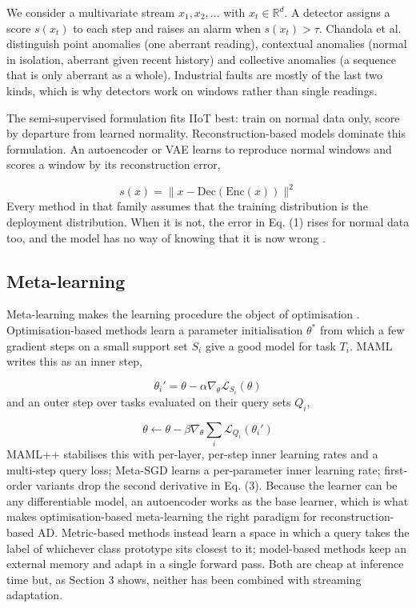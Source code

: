 We consider a multivariate stream \(x_1, x_2, \dots\) with \(x_t \in \mathbb{R}^d\). A detector assigns a score \(s(x_t)\) to each step and raises an alarm when \(s(x_t) > \tau\). Chandola et al. \citep{chandola2009survey} distinguish point anomalies (one aberrant reading), contextual anomalies (normal in isolation, aberrant given recent history) and collective anomalies (a sequence that is only aberrant as a whole). Industrial faults are mostly of the last two kinds, which is why detectors work on windows rather than single readings.

The semi-supervised formulation fits IIoT best: train on normal data only, score by departure from learned normality. Reconstruction-based models dominate this formulation. An autoencoder or VAE \citep{kingma2014vae} learns to reproduce normal windows and scores a window by its reconstruction error,

\begin{equation}
s(x) = \lVert x - \mathrm{Dec}(\mathrm{Enc}(x)) \rVert^2
\end{equation} Every method in that family assumes that the training distribution is the deployment distribution. When it is not, the error in Eq. (1) rises for normal data too, and the model has no way of knowing that it is now wrong \citep{kermenov2023drift, wahab2022online}.

\hypertarget{meta-learning}{%
\subsection{Meta-learning}\label{meta-learning}}

Meta-learning makes the learning procedure the object of optimisation \citep{hospedales2022meta}. Optimisation-based methods learn a parameter initialisation \(\theta^*\) from which a few gradient steps on a small support set \(S_i\) give a good model for task \(T_i\). MAML \citep{finn2017maml} writes this as an inner step,

\begin{equation}
\theta_i' = \theta - \alpha \nabla_\theta \mathcal{L}_{S_i}(\theta)
\end{equation} and an outer step over tasks evaluated on their query sets \(Q_i\),

\begin{equation}
\theta \leftarrow \theta - \beta \nabla_\theta \sum_i \mathcal{L}_{Q_i}(\theta_i')
\end{equation} MAML++ \citep{antoniou2019mamlpp} stabilises this with per-layer, per-step inner learning rates and a multi-step query loss; Meta-SGD \citep{li2017metasgd} learns a per-parameter inner learning rate; first-order variants \citep{nichol2018fomaml} drop the second derivative in Eq. (3). Because the learner can be any differentiable model, an autoencoder works as the base learner, which is what makes optimisation-based meta-learning the right paradigm for reconstruction-based AD. Metric-based methods \citep{snell2017proto} instead learn a space in which a query takes the label of whichever class prototype sits closest to it; model-based methods keep an external memory and adapt in a single forward pass. Both are cheap at inference time but, as Section 3 shows, neither has been combined with streaming adaptation.

